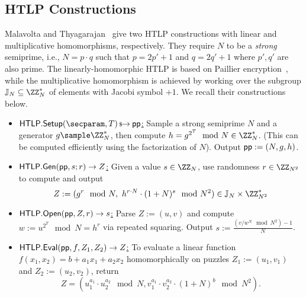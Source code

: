 \subsection{HTLP Constructions}\label{app:htlp_constructions}

Malavolta and Thyagarajan~\cite{C:MalThy19} give two HTLP constructions with linear and multiplicative homomorphisms, respectively. They require $N$ to be a \emph{strong} semiprime, i.e., $N = p \cdot q$ such that $p = 2p' + 1$ and $q = 2q' + 1$ where $p', q'$ are also prime. The linearly-homomorphic HTLP is based on Paillier encryption~\cite{C:Paillier99}, while the multiplicative homomorphism is achieved by working over the subgroup $\JJ_N \subseteq \ZZ_N^*$ of elements with Jacobi symbol $+1$. 
We recall their constructions below.

    \begin{construction}\label{con:paillierHTLP}
    \hfill
    \begin{itemize}
        \item \underline{$\htlp.\Setup(\secparam, \Ttime) \randout \pparam$:} Sample a strong semiprime $N$ and a generator $g \sample \ZZ_N^*$, then compute $h = g^{2^\Ttime} \mod{N} \in \ZZ_N^*$. (This can be computed efficiently using the factorization of $N$). Output $\mathsf{pp} := (N, g, h)$.
        \item \underline{$\mathsf{HTLP}.{\sf Gen}(\mathsf{pp}, s; r) \rightarrow Z$:} Given a value $s \in \ZZ_N$, use randomness $r \in \ZZ_{N^2}$ to compute and output
            $$Z := (g^r \mod{N},\ h^{r \cdot N} \cdot (1+N)^s \mod{N^2}) \in \JJ_N \times \ZZ_{N^2}^*$$
        \item \underline{$\mathsf{HTLP}.\mathsf{Open}(\mathsf{pp}, Z, r) \rightarrow s$:} Parse $Z := (u,v)$ and compute $w := u^{2^T} \mod{N} \allowbreak= h^r$ via repeated squaring. Output $s := \frac{(v/w^N \mod{N^2})- 1}{N}$.
        \item \underline{$\mathsf{HTLP}.{\sf Eval}(\mathsf{pp}, f, Z_1, Z_2) \rightarrow Z$:} To evaluate a linear function $f(x_1, x_2) = b + a_1 x_1 + a_2 x_2$ homomorphically on puzzles $Z_1 := (u_1, v_1)$ and $Z_2 := (u_2, v_2)$, return
        $$Z = (u_1^{a_1} \cdot u_2^{a_2} \mod{N}, v_1^{a_1} \cdot v_2^{a_2} \cdot (1+N)^b \mod{N^2}).$$
    \end{itemize}
    \end{construction}

